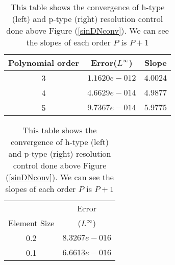 \begin{table}[h]
\centering \caption{\label{hconv2t} This table shows the convergence of h-type (left) and p-type (right) resolution control done above Figure (\ref{sinDNconv}). We can see the slopes of each order $P$ is $P+1$ }
\begin{tabular}{|c|c|c|} \hline
    Polynomial order&Error($L^{\infty}$)&Slope   \\ \hline \hline
    3&$1.1620e-012$ &$4.0024$ \\ \hline
    4&$4.6629e-014$ &$4.9877$ \\ \hline
    5&$9.7367e-014$ &$5.9775$ \\ \hline
\end{tabular}
\hspace{.5in}
\begin{tabular}{|c|c|} \hline
    &\multicolumn{1}{|c|}{Error}\\
    \raisebox{0.5\baselineskip}%
    {Element Size}&($L^{\infty}$) \\ \hline \hline
    0.2&$8.3267e-016$  \\ \hline
    0.1&$6.6613e-016$  \\ \hline
\end{tabular}

\end{table}
